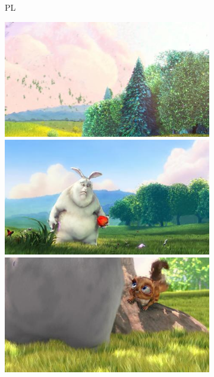 \begin{figure}
\begin{subfigure}[t]{0.135\textwidth}
		\caption{PL}
	\end{subfigure}
	\begin{subfigure}[t]{0.135\textwidth}
		\includegraphics[width=\textwidth]{figures/stereo/bbb_frame-0004-7}\\
		\includegraphics[width=\textwidth]{figures/stereo/bbb_frame-0092-7}\\
		\includegraphics[width=\textwidth]{figures/stereo/bbb_frame-0124-7}\\

\end{subfigure}
\end{figure}

